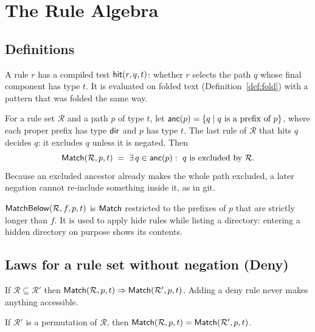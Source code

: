 \section{The Rule Algebra}
\label{sec:rules}

\subsection{Definitions}

A rule $r$ has a compiled test $\mathsf{hit}(r,q,t)$: whether $r$ selects the path $q$
whose final component has type $t$.  It is evaluated on folded text
(Definition~\ref{def:fold}) with a pattern that was folded the same way.

\begin{definition}[Exclusion]
\label{def:excl}
For a rule set $\mathcal R$ and a path $p$ of type $t$, let
$\mathsf{anc}(p)=\{q\mid q\text{ is a prefix of }p\}$, where each proper prefix has type
$\mathsf{dir}$ and $p$ has type $t$.  The last rule of $\mathcal R$ that hits $q$ decides
$q$: it excludes $q$ unless it is negated.  Then
\[
  \mathsf{Match}(\mathcal R,p,t)\;=\;\exists\, q\in\mathsf{anc}(p):\ q\text{ is excluded by }\mathcal R.
\]
Because an excluded ancestor already makes the whole path excluded, a later
negation cannot re-include something inside it, as in git.
\end{definition}

\begin{definition}
\label{def:matchbelow}
$\mathsf{MatchBelow}(\mathcal R,f,p,t)$ is $\mathsf{Match}$ restricted to the prefixes of $p$
that are strictly longer than $f$.  It is used to apply hide rules while listing
a directory: entering a hidden directory on purpose shows its contents.
\end{definition}

\subsection{Laws for a rule set without negation (Deny)}

\begin{law}
\label{law:deny-monotone}
If $\mathcal R\subseteq\mathcal R'$ then
$\mathsf{Match}(\mathcal R,p,t)\Rightarrow\mathsf{Match}(\mathcal R',p,t)$.  Adding a deny rule
never makes anything accessible.
\end{law}

\begin{law}
\label{law:deny-order}
If $\mathcal R'$ is a permutation of $\mathcal R$, then
$\mathsf{Match}(\mathcal R,p,t)=\mathsf{Match}(\mathcal R',p,t)$.
\end{law}

